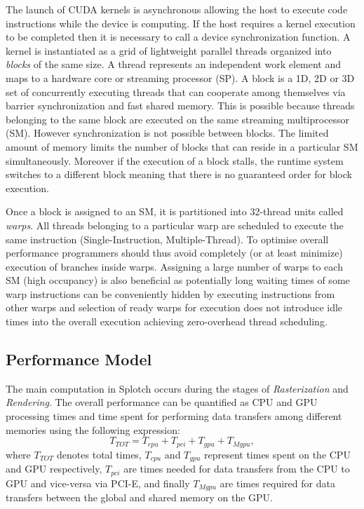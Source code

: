 \documentclass[1p]{elsarticle}
\begin{document}
The launch of CUDA kernels is asynchronous allowing the host to execute code instructions while the device is computing. If the host requires a kernel execution to be completed then it is necessary to call a device synchronization function. A kernel is instantiated as a grid of lightweight parallel threads organized into {\em blocks} of the same size. A thread represents an independent work element and maps to a hardware core or streaming processor (SP). A block is a 1D, 2D or 3D set of concurrently executing threads that can cooperate among themselves via barrier synchronization and fast shared memory. This is possible because threads belonging to the same block are executed on the same streaming multiprocessor (SM). However synchronization is not possible between blocks. The limited amount of memory limits the number of  blocks that can reside in a particular SM simultaneously. Moreover if the execution of a block stalls, the runtime system switches to a different block meaning that there is no guaranteed order for block execution.

Once a block is assigned to an SM, it is partitioned into 32-thread units called {\em warps}. All threads belonging to a particular warp are scheduled to execute the same instruction (Single-Instruction, Multiple-Thread). To optimise overall performance programmers should thus avoid completely (or at least minimize) execution of branches inside warps. Assigning a large number of warps to each SM (high occupancy) is also beneficial as potentially long waiting times of some warp instructions can be conveniently hidden by executing instructions from other warps and selection of ready warps for execution does not introduce idle times into the overall execution achieving zero-overhead thread scheduling. 

\subsection{Performance Model}
\label{sec:model}

The main computation in Splotch occurs during the stages of {\it Rasterization} and {\it Rendering}.
The overall performance can be quantified as CPU and GPU processing times 
and time spent for performing data transfers among different memories using the following expression:
\begin{equation}\label{Ts}
T_{TOT} = T_{cpu} + T_{pci} + T_{gpu} + T_{Mgpu},
\end{equation}
where $T_{TOT}$ denotes total times, 
$T_{cpu}$ and $T_{gpu}$ represent times spent on the CPU and GPU respectively, $T_{pci}$ are times needed for data transfers from the CPU to GPU and vice-versa via PCI-E, and finally $T_{Mgpu}$ are times required for data transfers between the global and shared memory on the GPU. 
\end{document}
